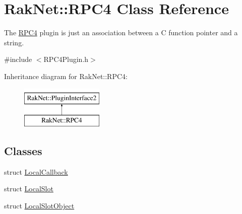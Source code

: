 \hypertarget{class_rak_net_1_1_r_p_c4}{\section{Rak\-Net\-:\-:R\-P\-C4 Class Reference}
\label{class_rak_net_1_1_r_p_c4}
}


The \hyperlink{class_rak_net_1_1_r_p_c4}{R\-P\-C4} plugin is just an association between a C function pointer and a string.  




{\ttfamily \#include $<$R\-P\-C4\-Plugin.\-h$>$}

Inheritance diagram for Rak\-Net\-:\-:R\-P\-C4\-:\begin{figure}[H]
\begin{center}
\leavevmode
\includegraphics[height=2.000000cm]{class_rak_net_1_1_r_p_c4}
\end{center}
\end{figure}
\subsection*{Classes}
\begin{DoxyCompactItemize}
\item 
struct \hyperlink{struct_rak_net_1_1_r_p_c4_1_1_local_callback}{Local\-Callback}
\item 
struct \hyperlink{struct_rak_net_1_1_r_p_c4_1_1_local_slot}{Local\-Slot}
\item 
struct \hyperlink{struct_rak_net_1_1_r_p_c4_1_1_local_slot_object}{Local\-Slot\-Object}
\end{DoxyCompactItemize}
